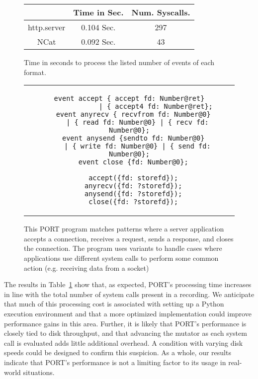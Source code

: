 \begin{figure}
  \begin{tabular}{|c|c|c}
                & Time in Sec. & Num. Syscalls.\\
              \hline
  http.server   & 0.104 Sec.   & 297   \\
  NCat          & 0.092 Sec.   & 43      \\
\end{tabular}
\caption{Time in seconds to process the listed number of events of each format.}
\label{tbl:RealWorldPerformance}
\end{figure}

\begin{figure}[H]
\centering
\begin{tabular}{c}
\begin{lstlisting}[gobble=2]
  event accept { accept fd: Number@ret}
             | { accept4 fd: Number@ret};
  event anyrecv { recvfrom fd: Number@0}
    | { read fd: Number@0} | { recv fd: Number@0};
  event anysend {sendto fd: Number@0}
    | { write fd: Number@0} | { send fd: Number@0};
  event close {fd: Number@0};

  accept({fd: storefd});
  anyrecv({fd: ?storefd});
  anysend({fd: ?storefd});
  close({fd: ?storefd});
\end{lstlisting}
\end{tabular}
\caption{This PORT program matches patterns where a server application
  accepts a connection, receives a request, sends a response, and closes
  the connection.  The program uses variants to handle cases where
  applications use different system calls to perform some common action
  (e.g. receiving data from a socket)}
\label{lst:RealWorldPerformance}
\end{figure}

The results in Table~\ref{tbl:RealWorldPerformance} show that, as expected,
PORT's
processing time increases in line with the total number of system calls
present in a recording.  We anticipate that much of this processing cost is
associated with setting up a Python execution environment and that a more
optimized implementation could improve performance gains in this area.
Further,
it is likely that PORT's performance is closely tied to
disk throughput,
and that advancing the mutator
as each system call is evaluated
adds little additional overhead.
A condition with varying disk
speeds could be designed to confirm this suspicion.  As a whole, our
results indicate that PORT's performance is not a limiting factor to its
usage in real-world situations.

